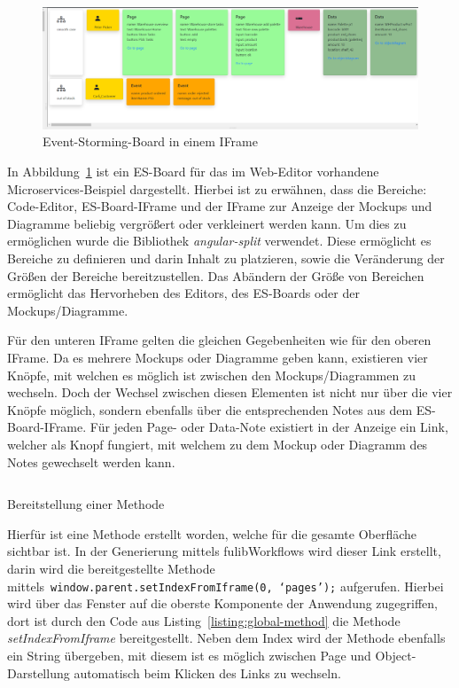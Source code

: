 
\begin{figure}[h]
    \centering
    \includegraphics[width=1.0\textwidth]{images/3.2/board}
    \caption{Event-Storming-Board in einem IFrame}
    \label{fig:esBoard}
\end{figure}

In Abbildung~\ref{fig:esBoard} ist ein \ac{ES}-Board für das im Web-Editor vorhandene Microservices-Beispiel dargestellt.
Hierbei ist zu erwähnen, dass die Bereiche: Code-Editor, \ac{ES}-Board-IFrame und der IFrame zur Anzeige der Mockups und Diagramme beliebig vergrößert oder verkleinert werden kann.
Um dies zu ermöglichen wurde die Bibliothek \textit{angular-split} verwendet.
Diese ermöglicht es Bereiche zu definieren und darin Inhalt zu platzieren, sowie die Veränderung der Größen der Bereiche bereitzustellen\cite*{angular-split}.
Das Abändern der Größe von Bereichen ermöglicht das Hervorheben des Editors, des \ac{ES}-Boards oder der Mockups/Diagramme.

Für den unteren IFrame gelten die gleichen Gegebenheiten wie für den oberen IFrame.
Da es mehrere Mockups oder Diagramme geben kann, existieren vier Knöpfe, mit welchen es möglich ist zwischen den Mockups/Diagrammen zu wechseln.
Doch der Wechsel zwischen diesen Elementen ist nicht nur über die vier Knöpfe möglich, sondern ebenfalls über die entsprechenden Notes aus dem \ac{ES}-Board-IFrame.
Für jeden Page- oder Data-Note existiert in der Anzeige ein Link, welcher als Knopf fungiert, mit welchem zu dem Mockup oder Diagramm des Notes gewechselt werden kann.

\begin{listing}[!ht]
    \inputminted{ts}{listings/3.2/method.ts}
    \caption{Bereitstellung einer Methode}
    \label{listing:global-method}
\end{listing}

Hierfür ist eine Methode erstellt worden, welche für die gesamte Oberfläche sichtbar ist.
In der Generierung mittels fulibWorkflows wird dieser Link erstellt, darin wird die bereitgestellte Methode mittels~\texttt{window.parent.setIndexFromIframe(0, `pages');} aufgerufen.
Hierbei wird über das Fenster auf die oberste Komponente der Anwendung zugegriffen, dort ist durch den Code aus Listing~\ref{listing:global-method}
die Methode \textit{setIndexFromIframe} bereitgestellt.
Neben dem Index wird der Methode ebenfalls ein String übergeben, mit diesem ist es möglich zwischen Page und Object-Darstellung automatisch beim Klicken des Links zu wechseln.

